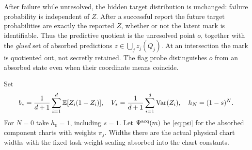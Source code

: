 After failure while unresolved, the hidden target distribution is unchanged: failure probability is independent of $Z$. After a successful report the future target probabilities are exactly the reported $Z$, whether or not the latent mark is identifiable. Thus the predictive quotient is the unresolved point $o$, together with the \emph{glued} set of absorbed predictions $z\in\bigcup_jz_j(Q_j)$. At an intersection the mark is quotiented out, not secretly retained. The flag probe distinguishes $o$ from an absorbed state even when their coordinate means coincide.

Set
\begin{equation}\label{eq:sensor-baseline}
 b_* =\frac1{d+1}\sum_{i=1}^d\mathbb E[Z_i(1-Z_i)],\quad
 V_* =\frac1{d+1}\sum_{i=1}^d\operatorname{Var}(Z_i),\quad
 h_N=(1-s)^N.
\end{equation}
For $N=0$ take $h_0=1$, including $s=1$. Let $\Psi^{\rm acq}(m)$ be \eqref{eq:psi} for the absorbed component charts with weights $\pi_j$. Widths there are the actual physical chart widths with the fixed task-weight scaling absorbed into the chart constants.

